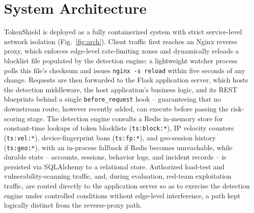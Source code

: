 \documentclass[conference]{IEEEtran}
\begin{document}
\section{System Architecture}
TokenShield is deployed as a fully containerized system with strict service-level network isolation (Fig.~\ref{fig:arch}). Client traffic first reaches an Nginx reverse proxy, which enforces edge-level rate-limiting zones and dynamically reloads a blocklist file populated by the detection engine; a lightweight watcher process polls this file's checksum and issues \texttt{nginx -s reload} within five seconds of any change. Requests are then forwarded to the Flask application server, which hosts the detection middleware, the host application's business logic, and its REST blueprints behind a single \texttt{before\_request} hook -- guaranteeing that no downstream route, however recently added, can execute before passing the risk-scoring stage. The detection engine consults a Redis in-memory store for constant-time lookups of token blocklists (\texttt{ts:block:*}), IP velocity counters (\texttt{ts:vel:*}), device-fingerprint bans (\texttt{ts:fp:*}), and geo-session history (\texttt{ts:geo:*}), with an in-process fallback if Redis becomes unreachable, while durable state -- accounts, sessions, behavior logs, and incident records -- is persisted via SQLAlchemy to a relational store. Authorized load-test and vulnerability-scanning traffic, and, during evaluation, red-team exploitation traffic, are routed directly to the application server so as to exercise the detection engine under controlled conditions without edge-level interference, a path kept logically distinct from the reverse-proxy path.
\end{document}
